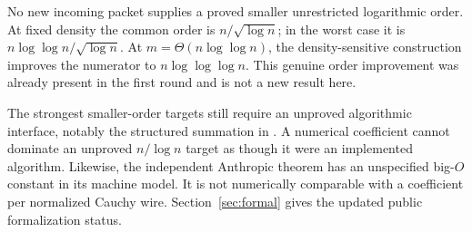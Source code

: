 No new incoming packet supplies a proved smaller unrestricted logarithmic
order. At fixed density the common order is $n/\sqrt{\log n}$; in the
worst case it is $n\log\log n/\sqrt{\log n}$. At
$m=\Theta(n\log\log n)$, the density-sensitive construction improves the
numerator to $n\log\log\log n$. This genuine order improvement was
already present in the first round and is not a new result here.

The strongest smaller-order targets still require an unproved algorithmic
interface, notably the structured summation in
. A numerical coefficient cannot dominate
an unproved $n/\log n$ target as though it were an implemented algorithm.
Likewise, the independent Anthropic theorem has an unspecified big-$O$
constant in its machine model. It is not numerically comparable with a
coefficient per normalized Cauchy wire. Section~\ref{sec:formal} gives the
updated public formalization status.
